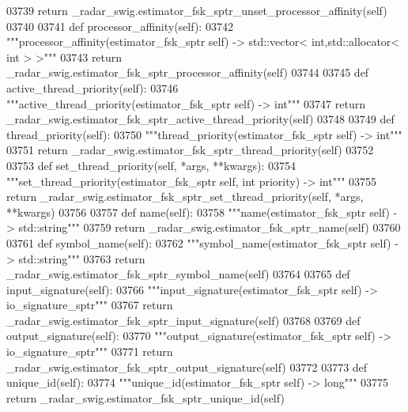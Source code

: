 \begin{DoxyCode}
{{{{{{{{{{{{{03739         \textcolor{keywordflow}{return} \_radar\_swig.estimator\_fsk\_sptr\_unset\_processor\_affinity(self)
03740 
03741     \textcolor{keyword}{def }processor_affinity(self):
03742         \textcolor{stringliteral}{"""processor\_affinity(estimator\_fsk\_sptr self) -> std::vector< int,std::allocator< int > >"""}
03743         \textcolor{keywordflow}{return} \_radar\_swig.estimator\_fsk\_sptr\_processor\_affinity(self)
03744 
03745     \textcolor{keyword}{def }active_thread_priority(self):
03746         \textcolor{stringliteral}{"""active\_thread\_priority(estimator\_fsk\_sptr self) -> int"""}
03747         \textcolor{keywordflow}{return} \_radar\_swig.estimator\_fsk\_sptr\_active\_thread\_priority(self)
03748 
03749     \textcolor{keyword}{def }thread_priority(self):
03750         \textcolor{stringliteral}{"""thread\_priority(estimator\_fsk\_sptr self) -> int"""}
03751         \textcolor{keywordflow}{return} \_radar\_swig.estimator\_fsk\_sptr\_thread\_priority(self)
03752 
03753     \textcolor{keyword}{def }set_thread_priority(self, *args, **kwargs):
03754         \textcolor{stringliteral}{"""set\_thread\_priority(estimator\_fsk\_sptr self, int priority) -> int"""}
03755         \textcolor{keywordflow}{return} \_radar\_swig.estimator\_fsk\_sptr\_set\_thread\_priority(self, *args, **kwargs)
03756 
03757     \textcolor{keyword}{def }name(self):
03758         \textcolor{stringliteral}{"""name(estimator\_fsk\_sptr self) -> std::string"""}
03759         \textcolor{keywordflow}{return} \_radar\_swig.estimator\_fsk\_sptr\_name(self)
03760 
03761     \textcolor{keyword}{def }symbol_name(self):
03762         \textcolor{stringliteral}{"""symbol\_name(estimator\_fsk\_sptr self) -> std::string"""}
03763         \textcolor{keywordflow}{return} \_radar\_swig.estimator\_fsk\_sptr\_symbol\_name(self)
03764 
03765     \textcolor{keyword}{def }input_signature(self):
03766         \textcolor{stringliteral}{"""input\_signature(estimator\_fsk\_sptr self) -> io\_signature\_sptr"""}
03767         \textcolor{keywordflow}{return} \_radar\_swig.estimator\_fsk\_sptr\_input\_signature(self)
03768 
03769     \textcolor{keyword}{def }output_signature(self):
03770         \textcolor{stringliteral}{"""output\_signature(estimator\_fsk\_sptr self) -> io\_signature\_sptr"""}
03771         \textcolor{keywordflow}{return} \_radar\_swig.estimator\_fsk\_sptr\_output\_signature(self)
03772 
03773     \textcolor{keyword}{def }unique_id(self):
03774         \textcolor{stringliteral}{"""unique\_id(estimator\_fsk\_sptr self) -> long"""}
03775         \textcolor{keywordflow}{return} \_radar\_swig.estimator\_fsk\_sptr\_unique\_id(self)
}}}}}}}}}}}}}
\end{DoxyCode}
